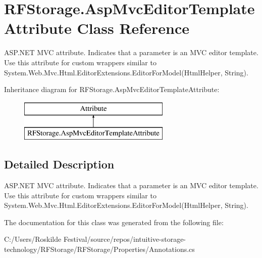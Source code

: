 \section{R\+F\+Storage.\+Asp\+Mvc\+Editor\+Template\+Attribute Class Reference}
\label{class_r_f_storage_1_1_asp_mvc_editor_template_attribute}


A\+S\+P.\+N\+ET M\+VC attribute. Indicates that a parameter is an M\+VC editor template. Use this attribute for custom wrappers similar to {\ttfamily System.\+Web.\+Mvc.\+Html.\+Editor\+Extensions.\+Editor\+For\+Model(\+Html\+Helper, String)}.  


Inheritance diagram for R\+F\+Storage.\+Asp\+Mvc\+Editor\+Template\+Attribute\+:\begin{figure}[H]
\begin{center}
\leavevmode
\includegraphics[height=2.000000cm]{class_r_f_storage_1_1_asp_mvc_editor_template_attribute}
\end{center}
\end{figure}


\subsection{Detailed Description}
A\+S\+P.\+N\+ET M\+VC attribute. Indicates that a parameter is an M\+VC editor template. Use this attribute for custom wrappers similar to {\ttfamily System.\+Web.\+Mvc.\+Html.\+Editor\+Extensions.\+Editor\+For\+Model(\+Html\+Helper, String)}. 



The documentation for this class was generated from the following file\+:\begin{DoxyCompactItemize}
\item 
C\+:/\+Users/\+Roskilde Festival/source/repos/intuitive-\/storage-\/technology/\+R\+F\+Storage/\+R\+F\+Storage/\+Properties/Annotations.\+cs\end{DoxyCompactItemize}
